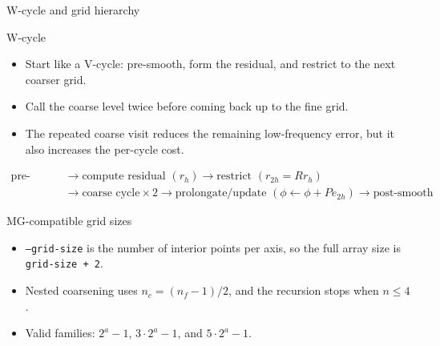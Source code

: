 \documentclass[aspectratio=169]{beamer}
\newcommand{\frametitlesub}[2]{#2}
\begin{document}
\begin{frame}[t]{\frametitlesub{Transfer operators and cycles}{W-cycle and grid hierarchy}}
    \footnotesize
    \begin{block}{W-cycle}
        \begin{itemize}
            \item Start like a V-cycle: pre-smooth, form the residual, and restrict to the next coarser grid.
            \item Call the coarse level twice before coming back up to the fine grid.
            \item The repeated coarse visit reduces the remaining low-frequency error, but it also increases the per-cycle cost.
        \end{itemize}
    \end{block}

    \[
        \begin{aligned}
            \text{pre-smooth} & \rightarrow \text{compute residual }(r_h) \rightarrow \text{restrict }(r_{2h}=Rr_h)                                                            \\
                              & \rightarrow \text{coarse cycle} \times 2 \rightarrow \text{prolongate/update }(\phi \leftarrow \phi + P e_{2h}) \rightarrow \text{post-smooth}
        \end{aligned}
    \]

    \begin{block}{MG-compatible grid sizes}
        \begin{itemize}
            \item \texttt{--grid-size} is the number of interior points per axis, so the full array size is \texttt{grid-size + 2}.
            \item Nested coarsening uses \(n_c = (n_f - 1)/2\), and the recursion stops when \(n \le 4\).
            \item Valid families: \(2^a - 1\), \(3 \cdot 2^a - 1\), and \(5 \cdot 2^a - 1\).
        \end{itemize}
    \end{block}
\end{frame}
\end{document}
